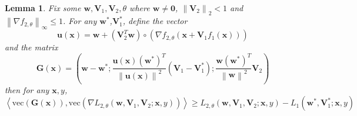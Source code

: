 \documentclass{article}
\theoremstyle{plain}
\newtheorem{lem}{Lemma}
\theoremstyle{definition}
\newcommand{\norm}[1]{\left\lVert#1\right\rVert}
\newcommand{\iprod}[2]{\left\langle #1,#2 \right\rangle}
\begin{document}
\begin{lem}
	Fix some $\mathbf{w},\mathbf{V}_1,\mathbf{V}_2,\theta$ where $\mathbf{w}\neq\mathbf{0}$, $\norm{\mathbf{V}_2}_2<1$ and $\norm{\nabla f_{2,\theta}}_\infty\leq 1$. For any $\mathbf{w}^*$,$\mathbf{V}_1^*$, define the vector
	\[\mathbf{u}(\mathbf{x})=\mathbf{w}+\left(\mathbf{V}_2^T\mathbf{w}\right)\circ(\nabla f_{2,\theta}(\mathbf{x}+\mathbf{V}_1f_1(\mathbf{x})))\]
	and the matrix
	\[\mathbf{G}(\mathbf{x})=\left(\mathbf{w}-\mathbf{w}^*;\frac{\mathbf{u}(\mathbf{x})\left(\mathbf{w}^{*}\right)^T}{\norm{\mathbf{u}(\mathbf{x})}^2}(\mathbf{V}_1-\mathbf{V}_1^*);\frac{\mathbf{w}\left(\mathbf{w}^{*}\right)^T}{\norm{\mathbf{w}}^2}\mathbf{V}_2\right)\]
	then for any $\mathbf{x},y$,
	\[\iprod{\text{vec}(\mathbf{G}(\mathbf{x}))}{\text{vec}\left(\nabla L_{2,\theta}(\mathbf{w},\mathbf{V}_1,\mathbf{V}_2;\mathbf{x},y)\right)}\geq L_{2,\theta}(\mathbf{w},\mathbf{V}_1,\mathbf{V}_2;\mathbf{x},y)-L_1(\mathbf{w}^*,\mathbf{V}_1^*;\mathbf{x},y)\]
\end{lem}
\end{document}
